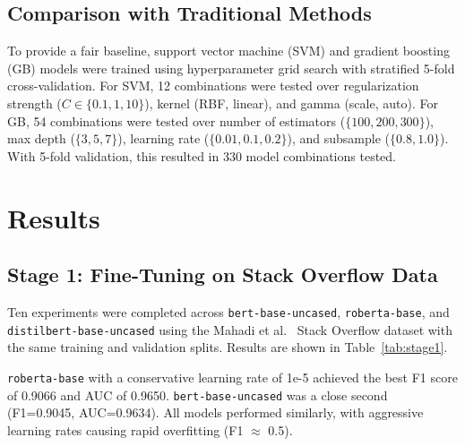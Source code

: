\documentclass[preprint,12pt]{elsarticle}
\begin{document}
\subsection{Comparison with Traditional Methods}

To provide a fair baseline, support vector machine (SVM) and gradient boosting (GB) models were trained using hyperparameter grid search with stratified 5-fold cross-validation. For SVM, 12 combinations were tested over regularization strength ($C \in \{0.1, 1, 10\}$), kernel (RBF, linear), and gamma (scale, auto). For GB, 54 combinations were tested over number of estimators ($\{100, 200, 300\}$), max depth ($\{3, 5, 7\}$), learning rate ($\{0.01, 0.1, 0.2\}$), and subsample ($\{0.8, 1.0\}$). With 5-fold validation, this resulted in 330 model combinations tested.

\section{Results}

\subsection{Stage 1: Fine-Tuning on Stack Overflow Data}

Ten experiments were completed across \texttt{bert-base-uncased}, \texttt{roberta-base}, and \texttt{distilbert-base-uncased} using the Mahadi et al.~\cite{mahadi2021} Stack Overflow dataset with the same training and validation splits. Results are shown in Table~\ref{tab:stage1}.

\texttt{roberta-base} with a conservative learning rate of 1e-5 achieved the best F1 score of 0.9066 and AUC of 0.9650. \texttt{bert-base-uncased} was a close second (F1=0.9045, AUC=0.9634). All models performed similarly, with aggressive learning rates causing rapid overfitting (F1 $\approx$ 0.5).
\end{document}

